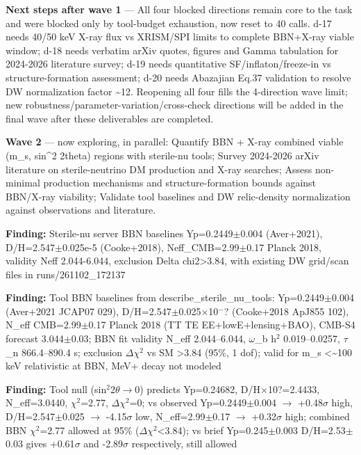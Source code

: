 \documentclass[11pt,a4paper]{article}
\begin{document}
\textbf{Next steps after wave 1} --- All four blocked directions remain core to the task and were blocked only by tool-budget exhaustion, now reset to 40 calls. d-17 needs 40/50 keV X-ray flux vs XRISM/SPI limits to complete BBN+X-ray viable window; d-18 needs verbatim arXiv quotes, figures and Gamma tabulation for 2024-2026 literature survey; d-19 needs quantitative SF/inflaton/freeze-in vs structure-formation assessment; d-20 needs Abazajian Eq.37 validation to resolve DW normalization factor \textasciitilde{}12. Reopening all four fills the 4-direction wave limit; new robustness/parameter-variation/cross-check directions will be added in the final wave after these deliverables are completed.

\textbf{Wave 2} --- now exploring, in parallel: Quantify BBN + X-ray combined viable (m\_s, sin\textasciicircum{}2 2theta) regions with sterile-nu tools; Survey 2024-2026 arXiv literature on sterile-neutrino DM production and X-ray searches; Assess non-minimal production mechanisms and structure-formation bounds against BBN/X-ray viability; Validate tool baselines and DW relic-density normalization against observations and literature.

\textbf{Finding:} Sterile-nu server BBN baselines Yp=0.2449$\pm$0.004 (Aver+2021), D/H=2.547$\pm$0.025e-5 (Cooke+2018), Neff\_CMB=2.99$\pm$0.17 Planck 2018, validity Neff 2.044-6.044, exclusion Delta chi2\textgreater{}3.84, with existing DW grid/scan files in runs/261102\_172137

\textbf{Finding:} Tool BBN baselines from describe\_sterile\_nu\_tools: Yp=0.2449$\pm$0.004 (Aver+2021 JCAP07 029), D/H=2.547$\pm$0.025$\times$10$^-$? (Cooke+2018 ApJ855 102), N\_eff CMB=2.99$\pm$0.17 Planck 2018 (TT TE EE+lowE+lensing+BAO), CMB-S4 forecast 3.044$\pm$0.03; BBN fit validity N\_eff 2.044--6.044, $\omega$\_b h$^2$ 0.019--0.0257, $\tau$\_n 866.4--890.4 s; exclusion $\Delta$$\chi$$^2$ vs SM \textgreater{}3.84 (95\%, 1 dof); valid for m\_s \textless{}\textasciitilde{}100 keV relativistic at BBN, MeV+ decay not modeled

\textbf{Finding:} Tool null (sin$^2$2$\theta$$\to$0) predicts Yp=0.24682, D/H$\times$10?=2.4433, N\_eff=3.0440, $\chi$$^2$=2.77, $\Delta$$\chi$$^2$=0; vs observed Yp=0.2449$\pm$0.004 $\to$ +0.48$\sigma$ high, D/H=2.547$\pm$0.025 $\to$ -4.15$\sigma$ low, N\_eff=2.99$\pm$0.17 $\to$ +0.32$\sigma$ high; combined BBN $\chi$$^2$=2.77 allowed at 95\% ($\Delta$$\chi$$^2$\textless{}3.84); vs brief Yp=0.245$\pm$0.003 D/H=2.53$\pm$0.03 gives +0.61$\sigma$ and -2.89$\sigma$ respectively, still allowed
\end{document}

